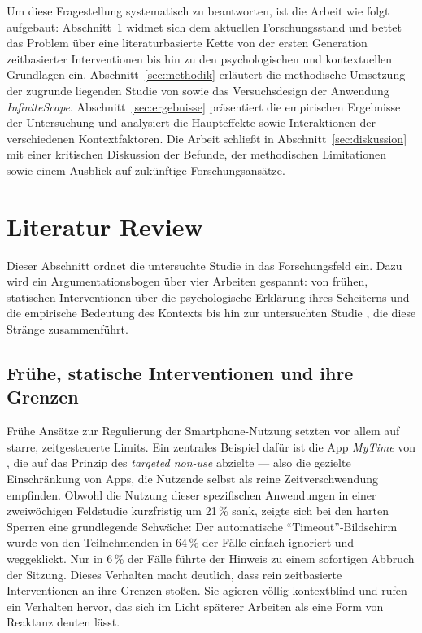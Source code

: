 \documentclass[11pt,a4paper]{article}
\begin{document}
Um diese Fragestellung systematisch zu beantworten, ist die Arbeit wie folgt aufgebaut:
Abschnitt~\ref{sec:literatur} widmet sich dem aktuellen Forschungsstand und bettet das
Problem über eine literaturbasierte Kette von der ersten Generation zeitbasierter
Interventionen bis hin zu den psychologischen und kontextuellen Grundlagen ein.
Abschnitt~\ref{sec:methodik} erläutert die methodische Umsetzung der zugrunde liegenden
Studie von \citet{meinhardt2025scrolling} sowie das Versuchsdesign der Anwendung
\emph{InfiniteScape}. Abschnitt~\ref{sec:ergebnisse} präsentiert die empirischen Ergebnisse
der Untersuchung und analysiert die Haupteffekte sowie Interaktionen der verschiedenen
Kontextfaktoren. Die Arbeit schließt in Abschnitt~\ref{sec:diskussion} mit einer kritischen
Diskussion der Befunde, der methodischen Limitationen sowie einem Ausblick auf zukünftige
Forschungsansätze.

\section{Literatur Review}
\label{sec:literatur}

Dieser Abschnitt ordnet die untersuchte Studie in das Forschungsfeld ein. Dazu wird ein
Argumentationsbogen über vier Arbeiten gespannt: von frühen, statischen Interventionen
\citep{hiniker2016mytime} über die psychologische Erklärung ihres Scheiterns
\citep{baughan2022dissociation} und die empirische Bedeutung des Kontexts
\citep{rixen2023loop} bis hin zur untersuchten Studie \citep{meinhardt2025scrolling}, die
diese Stränge zusammenführt.

\subsection{Frühe, statische Interventionen und ihre Grenzen}

Frühe Ansätze zur Regulierung der Smartphone-Nutzung setzten vor allem auf starre,
zeitgesteuerte Limits. Ein zentrales Beispiel dafür ist die App \emph{MyTime} von
\citet{hiniker2016mytime}, die auf das Prinzip des \emph{targeted non-use} abzielte ---
also die gezielte Einschränkung von Apps, die Nutzende selbst als reine Zeitverschwendung
empfinden. Obwohl die Nutzung dieser spezifischen Anwendungen in einer zweiwöchigen
Feldstudie kurzfristig um 21\,\% sank, zeigte sich bei den harten Sperren eine grundlegende
Schwäche: Der automatische \enquote{Timeout}-Bildschirm wurde von den Teilnehmenden in
64\,\% der Fälle einfach ignoriert und weggeklickt. Nur in 6\,\% der Fälle führte der
Hinweis zu einem sofortigen Abbruch der Sitzung. Dieses Verhalten macht deutlich, dass rein
zeitbasierte Interventionen an ihre Grenzen stoßen. Sie agieren völlig kontextblind und
rufen ein Verhalten hervor, das sich im Licht späterer Arbeiten als eine Form von Reaktanz
deuten lässt.
\end{document}
